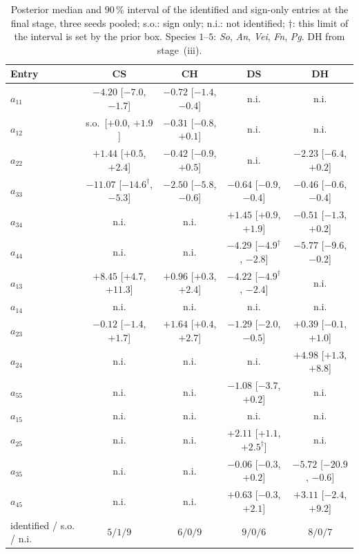 \begin{table}[htbp]
  \centering\scriptsize
  \setlength{\tabcolsep}{3pt}
  \begin{tabular}{@{}lcccc@{}}
    \toprule
    Entry & CS & CH & DS & DH\\
    \midrule
    $a_{11}$ & $-4.20$ [$-7.0$, $-1.7$] & $-0.72$ [$-1.4$, $-0.4$] & n.i. & n.i.\\
    $a_{12}$ & s.o.\ [$+0.0$, $+1.9$] & $-0.31$ [$-0.8$, $+0.1$] & n.i. & n.i.\\
    $a_{22}$ & $+1.44$ [$+0.5$, $+2.4$] & $-0.42$ [$-0.9$, $+0.5$] & n.i. & $-2.23$ [$-6.4$, $+0.2$]\\
    $a_{33}$ & $-11.07$ [$-14.6^\dagger$, $-5.3$] & $-2.50$ [$-5.8$, $-0.6$] & $-0.64$ [$-0.9$, $-0.4$] & $-0.46$ [$-0.6$, $-0.4$]\\
    $a_{34}$ & n.i. & n.i. & $+1.45$ [$+0.9$, $+1.9$] & $-0.51$ [$-1.3$, $+0.2$]\\
    $a_{44}$ & n.i. & n.i. & $-4.29$ [$-4.9^\dagger$, $-2.8$] & $-5.77$ [$-9.6$, $-0.2$]\\
    $a_{13}$ & $+8.45$ [$+4.7$, $+11.3$] & $+0.96$ [$+0.3$, $+2.4$] & $-4.22$ [$-4.9^\dagger$, $-2.4$] & n.i.\\
    $a_{14}$ & n.i. & n.i. & n.i. & n.i.\\
    $a_{23}$ & $-0.12$ [$-1.4$, $+1.7$] & $+1.64$ [$+0.4$, $+2.7$] & $-1.29$ [$-2.0$, $-0.5$] & $+0.39$ [$-0.1$, $+1.0$]\\
    $a_{24}$ & n.i. & n.i. & n.i. & $+4.98$ [$+1.3$, $+8.8$]\\
    $a_{55}$ & n.i. & n.i. & $-1.08$ [$-3.7$, $+0.2$] & n.i.\\
    $a_{15}$ & n.i. & n.i. & n.i. & n.i.\\
    $a_{25}$ & n.i. & n.i. & $+2.11$ [$+1.1$, $+2.5^\dagger$] & n.i.\\
    $a_{35}$ & n.i. & n.i. & $-0.06$ [$-0.3$, $+0.2$] & $-5.72$ [$-20.9$, $-0.6$]\\
    $a_{45}$ & n.i. & n.i. & $+0.63$ [$-0.3$, $+2.1$] & $+3.11$ [$-2.4$, $+9.2$]\\
    \midrule
    identified / s.o. / n.i. & $5/1/9$ & $6/0/9$ & $9/0/6$ & $8/0/7$\\
    \bottomrule
  \end{tabular}
  \caption[Classification of the interaction entries]{Posterior median and
  $90\,\%$ interval of the identified and sign-only entries at the final stage, three seeds
  pooled; s.o.: sign only; n.i.: not identified; $\dagger$: this limit of the
  interval is set by the prior box. Species $1$--$5$: \textit{So},
  \textit{An}, \textit{Vei}, \textit{Fn}, \textit{Pg}. DH from stage~(iii).}
  \label{tab:heine_ident}
\end{table}

